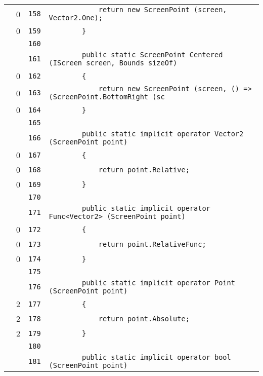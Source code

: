 \documentclass[a4paper,10pt]{article}
\begin{document}
\begin{longtable}[l]{lrrl}
\cellcolor{red} & 0 & \verb~158~ & \verb~            return new ScreenPoint (screen, Vector2.One);~\\
\cellcolor{red} & 0 & \verb~159~ & \verb~        }~\\
\cellcolor{gray} &  & \verb~160~ & \verb~~\\
\cellcolor{gray} &  & \verb~161~ & \verb~        public static ScreenPoint Centered (IScreen screen, Bounds sizeOf)~\\
\cellcolor{red} & 0 & \verb~162~ & \verb~        {~\\
\cellcolor{red} & 0 & \verb~163~ & \verb~            return new ScreenPoint (screen, () => (ScreenPoint.BottomRight (sc~\\
\cellcolor{red} & 0 & \verb~164~ & \verb~        }~\\
\cellcolor{gray} &  & \verb~165~ & \verb~~\\
\cellcolor{gray} &  & \verb~166~ & \verb~        public static implicit operator Vector2 (ScreenPoint point)~\\
\cellcolor{red} & 0 & \verb~167~ & \verb~        {~\\
\cellcolor{red} & 0 & \verb~168~ & \verb~            return point.Relative;~\\
\cellcolor{red} & 0 & \verb~169~ & \verb~        }~\\
\cellcolor{gray} &  & \verb~170~ & \verb~~\\
\cellcolor{gray} &  & \verb~171~ & \verb~        public static implicit operator Func<Vector2> (ScreenPoint point)~\\
\cellcolor{red} & 0 & \verb~172~ & \verb~        {~\\
\cellcolor{red} & 0 & \verb~173~ & \verb~            return point.RelativeFunc;~\\
\cellcolor{red} & 0 & \verb~174~ & \verb~        }~\\
\cellcolor{gray} &  & \verb~175~ & \verb~~\\
\cellcolor{gray} &  & \verb~176~ & \verb~        public static implicit operator Point (ScreenPoint point)~\\
\cellcolor{green} & 2 & \verb~177~ & \verb~        {~\\
\cellcolor{green} & 2 & \verb~178~ & \verb~            return point.Absolute;~\\
\cellcolor{green} & 2 & \verb~179~ & \verb~        }~\\
\cellcolor{gray} &  & \verb~180~ & \verb~~\\
\cellcolor{gray} &  & \verb~181~ & \verb~        public static implicit operator bool (ScreenPoint point)~\\

\end{longtable}
\end{document}
